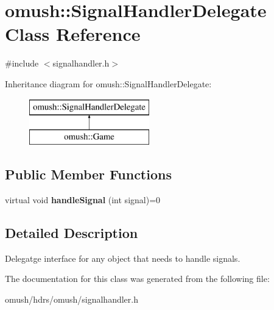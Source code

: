 \hypertarget{classomush_1_1_signal_handler_delegate}{\section{omush\-:\-:Signal\-Handler\-Delegate Class Reference}
\label{classomush_1_1_signal_handler_delegate}
}


{\ttfamily \#include $<$signalhandler.\-h$>$}

Inheritance diagram for omush\-:\-:Signal\-Handler\-Delegate\-:\begin{figure}[H]
\begin{center}
\leavevmode
\includegraphics[height=2.000000cm]{classomush_1_1_signal_handler_delegate}
\end{center}
\end{figure}
\subsection*{Public Member Functions}
\begin{DoxyCompactItemize}
\item 
\hypertarget{classomush_1_1_signal_handler_delegate_a8900e60d39bbc2c62b69b5aa74bd5c04}{virtual void {\bfseries handle\-Signal} (int signal)=0}\label{classomush_1_1_signal_handler_delegate_a8900e60d39bbc2c62b69b5aa74bd5c04}

\end{DoxyCompactItemize}


\subsection{Detailed Description}
Delegatge interface for any object that needs to handle signals. 

The documentation for this class was generated from the following file\-:\begin{DoxyCompactItemize}
\item 
omush/hdrs/omush/signalhandler.\-h\end{DoxyCompactItemize}
